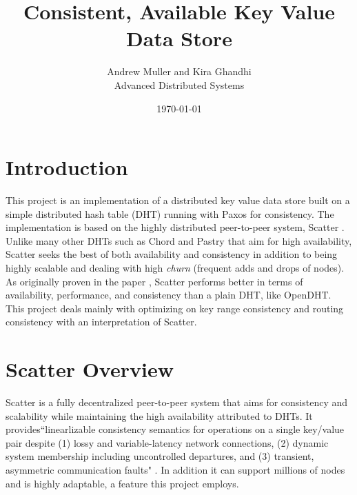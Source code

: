 \documentclass{amsart}
\theoremstyle{definition}
\theoremstyle{remark}
\numberwithin{equation}{section}
\begin{document}

 


\title{Consistent, Available Key Value Data Store}
\author{Andrew Muller and Kira Ghandhi \\
Advanced Distributed Systems}
\date{\today}
\maketitle

\tableofcontents

\section{Introduction}
This project is an implementation of a distributed key value data store built on a simple distributed hash table (DHT) running with Paxos \cite{Paxos} for consistency. The implementation is based on the highly distributed peer-to-peer system, Scatter \cite{Scatter}. Unlike many other DHTs such as Chord \cite{Chord} and Pastry \cite{Pastry} that aim for high availability, Scatter seeks the best of both availability and consistency in addition to being highly scalable and dealing with high \textit{churn} (frequent adds and drops of nodes). As originally proven in the paper \cite{Scatter}, Scatter performs better in terms of availability, performance, and consistency than a plain DHT, like OpenDHT. This project deals mainly with optimizing on key range consistency and routing consistency with an interpretation of Scatter.

\section{Scatter Overview}
Scatter is a fully decentralized peer-to-peer system that aims for consistency and scalability while maintaining the high availability attributed to DHTs. It provides``linearlizable consistency semantics for operations on a single key/value pair despite (1) lossy and variable-latency network connections, (2) dynamic system membership including uncontrolled departures, and (3) transient, asymmetric communication faults" \cite{Scatter}. In addition it can support  millions of nodes and is highly adaptable, a feature this project employs. 
\end{document}
